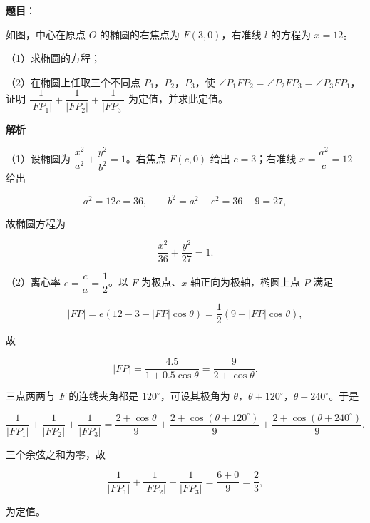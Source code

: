 \begin{answer}

\textbf{题目}：

如图，中心在原点 $O$ 的椭圆的右焦点为 $F(3,0)$，右准线 $l$ 的方程为 $x=12$。

（1）求椭圆的方程；

（2）在椭圆上任取三个不同点 $P_1$，$P_2$，$P_3$，使 $\angle P_1FP_2=\angle P_2FP_3=\angle P_3FP_1$，证明 $\dfrac1{|FP_1|}+\dfrac1{|FP_2|}+\dfrac1{|FP_3|}$ 为定值，并求此定值。
\nopagebreak[4]
\begin{center}\end{center}
\nopagebreak[4]
\textbf{解析}

（1）设椭圆为 $\dfrac{x^2}{a^2}+\dfrac{y^2}{b^2}=1$。右焦点 $F(c,0)$ 给出 $c=3$；右准线 $x=\dfrac{a^2}c=12$ 给出

\nopagebreak[4]
\[a^2=12c=36,\qquad b^2=a^2-c^2=36-9=27,\]

故椭圆方程为

\nopagebreak[4]
\[\frac{x^2}{36}+\frac{y^2}{27}=1.\]

（2）离心率 $e=\dfrac ca=\dfrac12$。以 $F$ 为极点、$x$ 轴正向为极轴，椭圆上点 $P$ 满足

\nopagebreak[4]
\[|FP|=e\left(12-3-|FP|\cos\theta\right)=\frac12\left(9-|FP|\cos\theta\right),\]

故

\nopagebreak[4]
\[|FP|=\frac{4.5}{1+0.5\cos\theta}=\frac9{2+\cos\theta}.\]

三点两两与 $F$ 的连线夹角都是 $120^\circ$，可设其极角为 $\theta$，$\theta+120^\circ$，$\theta+240^\circ$。于是

\nopagebreak[4]
\[\frac1{|FP_1|}+\frac1{|FP_2|}+\frac1{|FP_3|}
=\frac{2+\cos\theta}9+\frac{2+\cos(\theta+120^\circ)}9+\frac{2+\cos(\theta+240^\circ)}9.\]

三个余弦之和为零，故

\nopagebreak[4]
\[\frac1{|FP_1|}+\frac1{|FP_2|}+\frac1{|FP_3|}=\frac{6+0}9=\frac23,\]

为定值。


\end{answer}